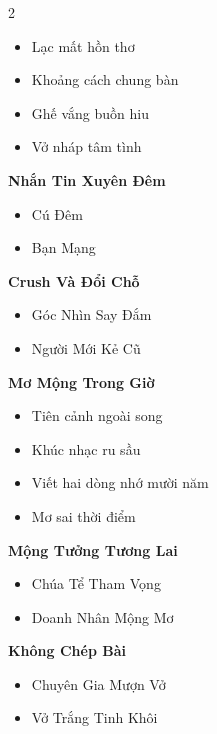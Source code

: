 \begin{multicols}{2}
\begin{itemize}[leftmargin=1.2em, itemsep=0.1em, label=\textcolor{titlecolor}{\tiny$\blacksquare$}]
  \item Lạc mất hồn thơ
  \item Khoảng cách chung bàn
  \item Ghế vắng buồn hiu
  \item Vở nháp tâm tình
\end{itemize}
\vspace{0.8em}
\textbf{\color{chapterline}Nhắn Tin Xuyên Đêm}
\begin{itemize}[leftmargin=1.2em, itemsep=0.1em, label=\textcolor{titlecolor}{\tiny$\blacksquare$}]
  \item Cú Đêm
  \item Bạn Mạng
\end{itemize}
\vspace{0.8em}
\textbf{\color{chapterline}Crush Và Đổi Chỗ}
\begin{itemize}[leftmargin=1.2em, itemsep=0.1em, label=\textcolor{titlecolor}{\tiny$\blacksquare$}]
  \item Góc Nhìn Say Đắm
  \item Người Mới Kẻ Cũ
\end{itemize}
\vspace{0.8em}
\textbf{\color{chapterline}Mơ Mộng Trong Giờ}
\begin{itemize}[leftmargin=1.2em, itemsep=0.1em, label=\textcolor{titlecolor}{\tiny$\blacksquare$}]
  \item Tiên cảnh ngoài song
  \item Khúc nhạc ru sầu
  \item Viết hai dòng nhớ mười năm
  \item Mơ sai thời điểm
\end{itemize}
\vspace{0.8em}
\textbf{\color{chapterline}Mộng Tưởng Tương Lai}
\begin{itemize}[leftmargin=1.2em, itemsep=0.1em, label=\textcolor{titlecolor}{\tiny$\blacksquare$}]
  \item Chúa Tể Tham Vọng
  \item Doanh Nhân Mộng Mơ
\end{itemize}
\vspace{0.8em}
\textbf{\color{chapterline}Không Chép Bài}
\begin{itemize}[leftmargin=1.2em, itemsep=0.1em, label=\textcolor{titlecolor}{\tiny$\blacksquare$}]
  \item Chuyên Gia Mượn Vở
  \item Vở Trắng Tinh Khôi
\end{itemize}
\vspace{0.8em}

\end{multicols}

